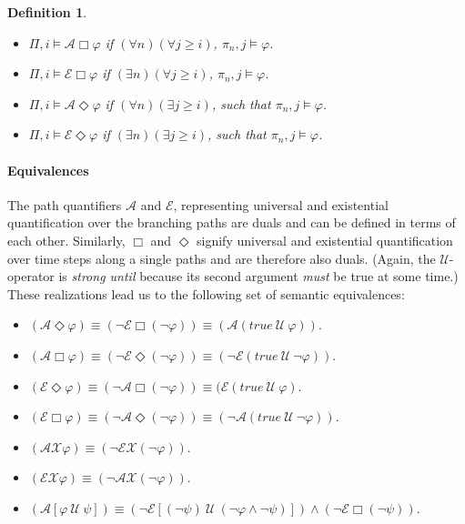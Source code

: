 \documentclass{elsarticle} %
\newtheorem{defin}{Definition}
\renewcommand{\phi}{\varphi}
\begin{document}
\begin{defin}
\begin{itemize}
\item $\Pi, i \vDash \mathcal{A}\Box \phi$ if $(\forall n)(\forall j \ge i)$, $\pi_n, j \vDash \phi$.
\item $\Pi, i \vDash \mathcal{E}\Box \phi$ if $(\exists n)(\forall j \ge i)$, $\pi_n, j \vDash \phi$.
\item $\Pi, i \vDash \mathcal{A}\Diamond \phi$ if $(\forall n)(\exists j \ge i)$, such that $\pi_n, j \vDash \phi$.
\item $\Pi, i \vDash \mathcal{E}\Diamond \phi$ if $(\exists n)(\exists j \ge i)$, such that $\pi_n, j \vDash \phi$.
\end{itemize}
\end{defin} 



\paragraph{Equivalences} The path quantifiers $\mathcal{A}$ and $\mathcal{E}$, representing universal and existential quantification over the branching paths are duals and can be defined in terms of each other. Similarly, $\Box$ and $\Diamond$ signify universal and existential quantification over time steps along a single paths and are therefore also duals. (Again, the $\mathcal{U}$-operator is \emph{strong until} because its second argument \emph{must} be true at some time.)
These realizations lead us to the following set of semantic equivalences:


\begin{itemize}
\item $(\mathcal{A}\Diamond \phi) \equiv (\neg \mathcal{E}\Box (\neg \phi)) \equiv (\mathcal{A}(true \ \mathcal{U} \ \phi))$.
\item $(\mathcal{A}\Box \phi) \equiv (\neg\mathcal{E}\Diamond(\neg \phi)) \equiv (\neg\mathcal{E}(true \ \mathcal{U} \ \neg \phi))$.
\item $(\mathcal{E}\Diamond \phi) \equiv (\neg \mathcal{A}\Box (\neg \phi)) \equiv (\mathcal{E}(true \ \mathcal{U} \ \phi)$.
\item $(\mathcal{E}\Box \phi) \equiv (\neg \mathcal{A}\Diamond (\neg \phi)) \equiv (\neg \mathcal{A}(true \ \mathcal{U} \ \neg \phi))$.
\item $(\mathcal{AX}\phi) \equiv (\neg \mathcal{EX}(\neg \phi))$.
\item $(\mathcal{EX}\phi) \equiv (\neg \mathcal{AX}(\neg \phi))$.
\item $(\mathcal{A}[\phi \ \mathcal{U} \ \psi]) \equiv (\neg \mathcal{E}[(\neg \psi) \ \mathcal{U} \ (\neg \phi \wedge \neg \psi)]) \wedge (\neg \mathcal{E}\Box (\neg \psi))$.
\end{itemize}
\end{document}
